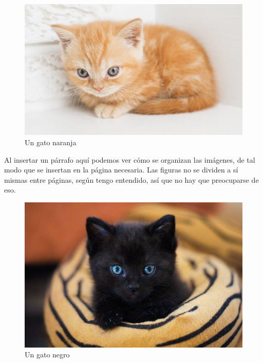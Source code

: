 \documentclass{article}
\begin{document}
\begin{figure}[H]
    \centering 
    \includegraphics[width=1.0\hsize]{./img/gatito}
    \caption{Un gato naranja}
    \label{fig:gatitoNaranja} 
\end{figure}

Al insertar un párrafo aquí podemos ver cómo se organizan las imágenes, de tal
modo que se insertan en la página necesaria. Las figuras no se dividen a sí
mismas entre páginas, según tengo entendido, así que no hay que preocuparse
de eso.

\begin{figure}[H]
    \centering
    \includegraphics[width=0.3333\hsize]{./img/gatitoNegro}
    \caption{Un gato negro} %
    \label{fig:gatitoNegro} %
\end{figure}
\end{document}
